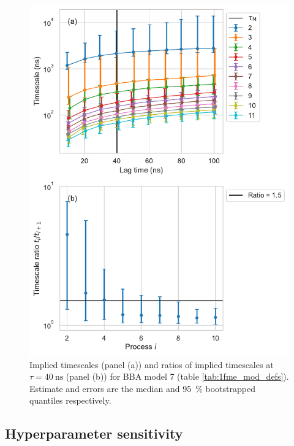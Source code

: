 \documentclass{article}
\begin{document}
\begin{figure}
    \centering
    \includegraphics[height=0.65\textheight]{figures/its/bba/BBA_model_dist._method_m2.pdf}
    \caption{Implied timescales (panel (a)) and ratios of implied timescales at $\tau=\SI{40}{\nano\second}$ (panel (b)) for BBA model 7 (table \ref{tab:1fme_mod_defs}). Estimate and errors are the median and \SI{95}{\percent} bootstrapped quantiles respectively.}
    \label{fig:its_bba_7}
\end{figure}

\clearpage
\subsection{Hyperparameter sensitivity}
\end{document}
